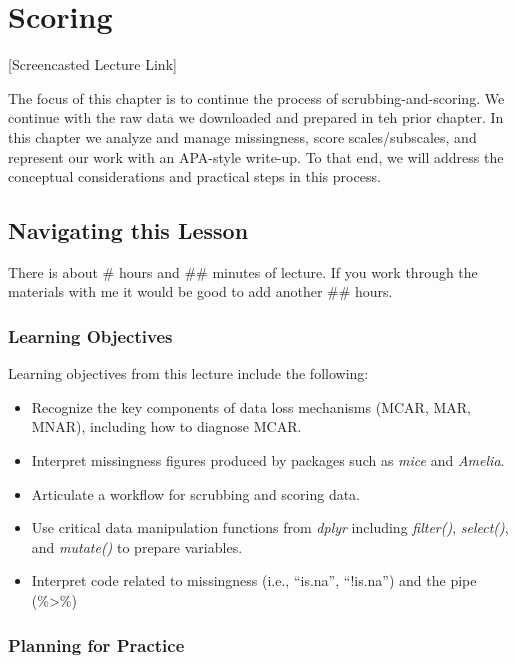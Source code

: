 \documentclass[
  english,
]{book}
\providecommand{\tightlist}{%
  \setlength{\itemsep}{0pt}\setlength{\parskip}{0pt}}
\begin{document}
\hypertarget{score}{%
\chapter{Scoring}\label{score}}

{[}Screencasted Lecture Link{]}

The focus of this chapter is to continue the process of scrubbing-and-scoring. We continue with the raw data we downloaded and prepared in teh prior chapter. In this chapter we analyze and manage missingness, score scales/subscales, and represent our work with an APA-style write-up. To that end, we will address the conceptual considerations and practical steps in this process.

\hypertarget{navigating-this-lesson-1}{%
\section{Navigating this Lesson}\label{navigating-this-lesson-1}}

There is about \# hours and \#\# minutes of lecture. If you work through the materials with me it would be good to add another \#\# hours.

\hypertarget{learning-objectives-1}{%
\subsection{Learning Objectives}\label{learning-objectives-1}}

Learning objectives from this lecture include the following:

\begin{itemize}
\tightlist
\item
  Recognize the key components of data loss mechanisms (MCAR, MAR, MNAR), including how to diagnose MCAR.
\item
  Interpret missingness figures produced by packages such as \emph{mice} and \emph{Amelia}.
\item
  Articulate a workflow for scrubbing and scoring data.
\item
  Use critical data manipulation functions from \emph{dplyr} including \emph{filter()}, \emph{select()}, and \emph{mutate()} to prepare variables.
\item
  Interpret code related to missingness (i.e., ``is.na'', ``!is.na'') and the pipe (\%\textgreater\%)
\end{itemize}

\hypertarget{planning-for-practice-1}{%
\subsection{Planning for Practice}\label{planning-for-practice-1}}
\end{document}
